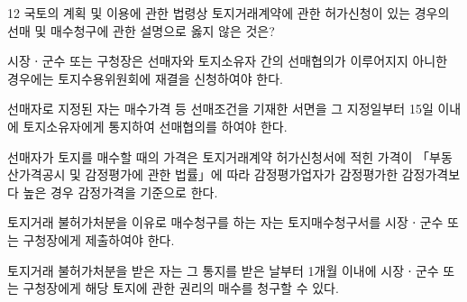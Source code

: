 \begin{question}{12}
국토의 계획 및 이용에 관한 법령상 토지거래계약에 관한 허가신청이 있는 경우의 선매 및 매수청구에 관한 설명으로 옳지 않은 것은?
\begin{choices}
  \item 시장ㆍ군수 또는 구청장은 선매자와 토지소유자 간의 선매협의가 이루어지지 아니한 경우에는 토지수용위원회에 재결을 신청하여야 한다.
  \item 선매자로 지정된 자는 매수가격 등 선매조건을 기재한 서면을 그 지정일부터 15일 이내에 토지소유자에게 통지하여 선매협의를 하여야 한다.
  \item 선매자가 토지를 매수할 때의 가격은 토지거래계약 허가신청서에 적힌 가격이 「부동산가격공시 및 감정평가에 관한 법률」에 따라 감정평가업자가 감정평가한 감정가격보다 높은 경우 감정가격을 기준으로 한다.
  \item 토지거래 불허가처분을 이유로 매수청구를 하는 자는 토지매수청구서를 시장ㆍ군수 또는 구청장에게 제출하여야 한다.
  \item 토지거래 불허가처분을 받은 자는 그 통지를 받은 날부터 1개월 이내에 시장ㆍ군수 또는 구청장에게 해당 토지에 관한 권리의 매수를 청구할 수 있다.
\end{choices}
\end{question}
